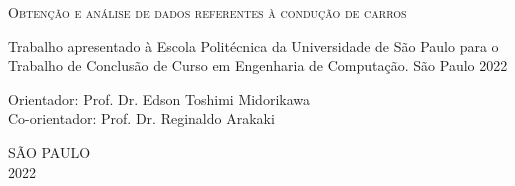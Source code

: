 \begin{titlepage}
\vfill
\begin{center}
    \vspace{2cm}
    {\Large \textsc{Obtenção e análise de dados referentes à condução de carros}\\}
    \vspace{1cm}
    \hspace{.45\linewidth}
    \begin{minipage}{.50\linewidth}

            Trabalho apresentado à Escola Politécnica da Universidade de São Paulo para
            o Trabalho de Conclusão de Curso em Engenharia de Computação.
            São Paulo
            2022

            \vspace{0.5 cm}

            Orientador:     Prof. Dr. Edson Toshimi Midorikawa\\
            Co-orientador: Prof. Dr. Reginaldo Arakaki\\
    
    \end{minipage}

    \vspace{2cm}
    \vfill
    {\large SÃO PAULO\\ 2022}
\end{center}

\end{titlepage}